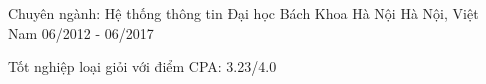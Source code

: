 

\begin{cventries}

  \cventry
    {Chuyên ngành: Hệ thống thông tin} %
    {Đại học Bách Khoa Hà Nội} %
    {Hà Nội, Việt Nam} %
    {06/2012 - 06/2017} %
    {
      \begin{cvitems} %
        \item {Tốt nghiệp loại giỏi với điểm CPA: 3.23/4.0}
      \end{cvitems}
    }

\end{cventries}
